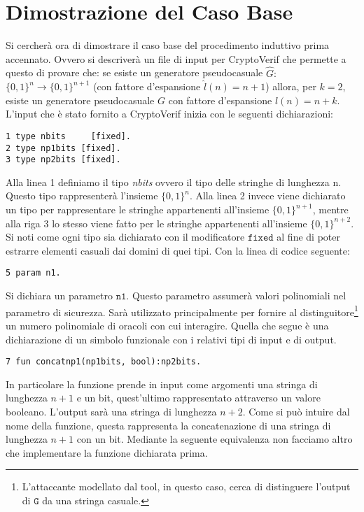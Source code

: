 \documentclass[a4paper,openright,twoside,12pt]{report}
\begin{document}
\section{Dimostrazione del Caso Base}
Si cercher\`a ora di dimostrare il caso base del procedimento induttivo prima accennato. Ovvero si descriver\`a un file di input per CryptoVerif che permette a questo di provare che:
se esiste un generatore pseudocasuale $\hat{G}:$ $\{0, 1\}^n \rightarrow \{0, 1\}^{n+1}$ 
(con fattore d'espansione $\hat{l}(n)=n+1$) allora, per $k=2$, esiste un generatore 
pseudocasuale $G$ con fattore d'espansione $l(n)=n+k$.
L'input che \`e stato fornito a CryptoVerif inizia con le seguenti dichiarazioni:
\begin{verbatim}
1 type nbits 	 [fixed].     
2 type np1bits [fixed].   
3 type np2bits [fixed].   
\end{verbatim}
Alla linea 1 definiamo il tipo \emph{nbits} ovvero il tipo delle stringhe di lunghezza n. Questo tipo rappresenter\`a l'insieme $\{0, 1\}^n$. Alla linea 2 invece viene dichiarato un tipo
per rappresentare le stringhe appartenenti all'insieme $\{0, 1\}^{n+1}$, mentre alla riga 3 lo stesso viene fatto per le stringhe
appartenenti all'insieme $\{0, 1\}^{n+2}$. Si noti come ogni tipo sia dichiarato con il modificatore $\texttt{fixed}$ al fine di poter estrarre elementi casuali dai domini di quei tipi.
Con la linea di codice seguente:
\begin{verbatim}
5 param n1.
\end{verbatim}
Si dichiara un parametro $\texttt{n1}$. Questo parametro assumer\`a valori polinomiali nel parametro di sicurezza. 
Sar\`a utilizzato principalmente per fornire al distinguitore\footnote{L'attaccante modellato dal tool, in questo caso, 
cerca di distinguere l'output di $\texttt{G}$ da una stringa casuale.} un numero polinomiale di oracoli con cui interagire.
Quella che segue \`e una dichiarazione di un simbolo funzionale con i relativi tipi di input e di output.
\begin{verbatim}  
7 fun concatnp1(np1bits, bool):np2bits.
\end{verbatim}
In particolare la funzione prende in input come argomenti una stringa di lunghezza $n+1$ e un bit, quest'ultimo rappresentato attraverso
un valore booleano. L'output sar\`a una stringa di lunghezza $n+2$.
Come si pu\`o intuire dal nome della funzione, questa rappresenta la concatenazione di una stringa di lunghezza $n+1$ con un bit.
Mediante la seguente equivalenza non facciamo altro che implementare la funzione dichiarata prima.
\end{document}
